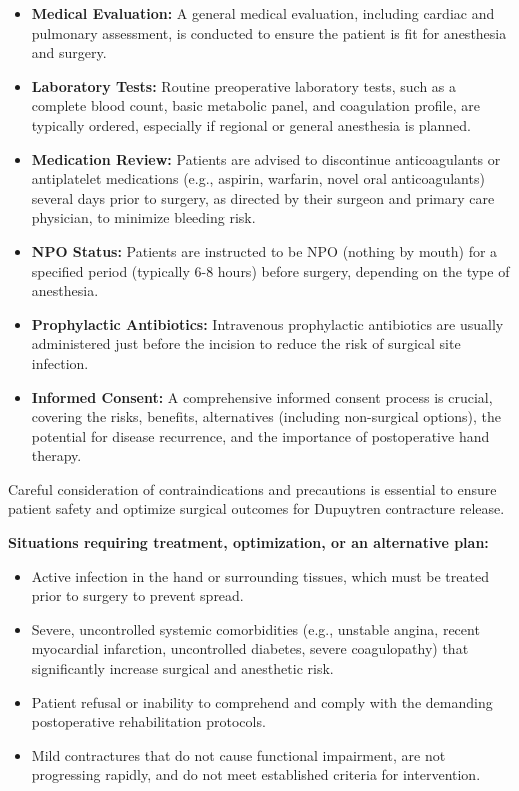 \begin{itemize}
  \item \textbf{Medical Evaluation:} A general medical evaluation, including cardiac and pulmonary assessment, is conducted to ensure the patient is fit for anesthesia and surgery.
  \item \textbf{Laboratory Tests:} Routine preoperative laboratory tests, such as a complete blood count, basic metabolic panel, and coagulation profile, are typically ordered, especially if regional or general anesthesia is planned.
  \item \textbf{Medication Review:} Patients are advised to discontinue anticoagulants or antiplatelet medications (e.g., aspirin, warfarin, novel oral anticoagulants) several days prior to surgery, as directed by their surgeon and primary care physician, to minimize bleeding risk.
  \item \textbf{NPO Status:} Patients are instructed to be NPO (nothing by mouth) for a specified period (typically 6-8 hours) before surgery, depending on the type of anesthesia.
  \item \textbf{Prophylactic Antibiotics:} Intravenous prophylactic antibiotics are usually administered just before the incision to reduce the risk of surgical site infection.
  \item \textbf{Informed Consent:} A comprehensive informed consent process is crucial, covering the risks, benefits, alternatives (including non-surgical options), the potential for disease recurrence, and the importance of postoperative hand therapy.
\end{itemize}

Careful consideration of contraindications and precautions is essential to ensure patient safety and optimize surgical outcomes for Dupuytren contracture release.

\textbf{Situations requiring treatment, optimization, or an alternative plan:}
\begin{itemize}
  \item Active infection in the hand or surrounding tissues, which must be treated prior to surgery to prevent spread.
  \item Severe, uncontrolled systemic comorbidities (e.g., unstable angina, recent myocardial infarction, uncontrolled diabetes, severe coagulopathy) that significantly increase surgical and anesthetic risk.
  \item Patient refusal or inability to comprehend and comply with the demanding postoperative rehabilitation protocols.
  \item Mild contractures that do not cause functional impairment, are not progressing rapidly, and do not meet established criteria for intervention.
\end{itemize}

